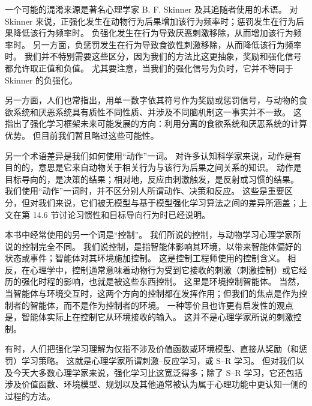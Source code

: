 \documentclass[UTF8,12pt,a4paper,fontset=fandol]{ctexart}
\begin{document}
一个可能的混淆来源是著名心理学家 B. F. Skinner 及其追随者使用的术语。
对 Skinner 来说，正强化发生在动物行为后果增加该行为频率时；惩罚发生在行为后果降低该行为频率时。
负强化发生在行为导致厌恶刺激移除，从而增加该行为频率时。
另一方面，负惩罚发生在行为导致食欲性刺激移除，从而降低该行为频率时。
我们并不特别需要这些区分，因为我们的方法比这更抽象，奖励和强化信号都允许取正值和负值。
尤其要注意，当我们的强化信号为负时，它并不等同于 Skinner 的负强化。

另一方面，人们也常指出，用单一数字依其符号作为奖励或惩罚信号，与动物的食欲系统和厌恶系统具有质性不同性质、并涉及不同脑机制这一事实并不一致。
这指出了强化学习框架未来可能发展的方向：利用分离的食欲系统和厌恶系统的计算优势。
但目前我们暂且略过这些可能性。

另一个术语差异是我们如何使用“动作”一词。
对许多认知科学家来说，动作是有目的的，意思是它来自动物关于相关行为与该行为后果之间关系的知识。
动作是目标导向的，是决策的结果；相对地，反应由刺激触发，是反射或习惯的结果。
我们使用“动作”一词时，并不区分别人所谓动作、决策和反应。
这些是重要区分，但对我们来说，它们被无模型与基于模型强化学习算法之间的差异所涵盖；上文在第 14.6 节讨论习惯性和目标导向行为时已经说明。

本书中经常使用的另一个词是“控制”。
我们所说的控制，与动物学习心理学家所说的控制完全不同。
我们说控制，是指智能体影响其环境，以带来智能体偏好的状态或事件；智能体对其环境施加控制。
这是控制工程师使用的控制含义。
相反，在心理学中，控制通常意味着动物行为受到它接收的刺激（刺激控制）或它经历的强化时程的影响，也就是被这些东西控制。
这里是环境控制智能体。
当然，当智能体与环境交互时，这两个方向的控制都在发挥作用；但我们的焦点是作为控制者的智能体，而不是作为控制者的环境。
一种等价且也许更有启发性的观点是，智能体实际上在控制它从环境接收的输入。
这并不是心理学家所说的刺激控制。

有时，人们把强化学习理解为仅指不涉及价值函数或环境模型、直接从奖励（和惩罚）学习策略。
这就是心理学家所谓刺激--反应学习，或 S--R 学习。
但对我们以及今天大多数心理学家来说，强化学习比这宽泛得多；除了 S--R 学习，它还包括涉及价值函数、环境模型、规划以及其他通常被认为属于心理功能中更认知一侧的过程的方法。
\end{document}
